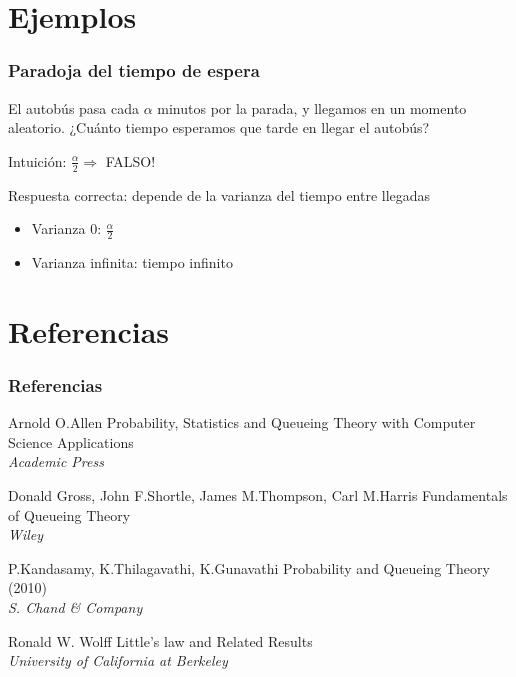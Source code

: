 \documentclass[8pt]{beamer}
\begin{document}
  \section{Ejemplos}
  \begin{frame}\frametitle{Paradoja del tiempo de espera}
    El autobús pasa cada $\alpha$ minutos por la parada, y llegamos en un momento aleatorio. ¿Cuánto tiempo esperamos que tarde en llegar el autobús?

    Intuición:  $\frac{\alpha}{2} \Rightarrow$  FALSO!

    Respuesta correcta: depende de la varianza del tiempo entre llegadas
    \begin{itemize}
    \item Varianza 0: $\frac{\alpha}{2}$
    \item Varianza infinita: tiempo infinito
    \end{itemize}
  \end{frame}

\section {Referencias}
\begin{frame}
\frametitle{Referencias}
\footnotesize{
  \begin{thebibliography}{99} %
     Arnold O.Allen
      \newblock Probability, Statistics and Queueing Theory with Computer Science Applications\\
      \newblock \emph{Academic Press}

     Donald Gross, John F.Shortle, James M.Thompson, Carl M.Harris
      \newblock Fundamentals of Queueing Theory\\
      \newblock \emph{Wiley}

     P.Kandasamy, K.Thilagavathi, K.Gunavathi
      \newblock Probability and Queueing Theory (2010)\\
      \newblock \emph{S. Chand \& Company}

     Ronald W. Wolff
      \newblock Little's law and Related Results\\
      \newblock \emph{University of California at Berkeley}

  \end{thebibliography}
}
\end{frame}
\end{document}
